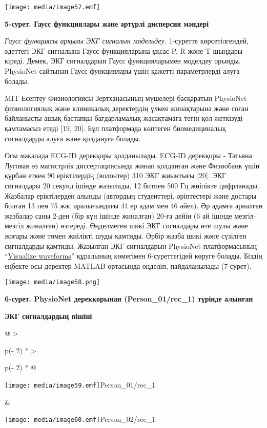 \documentclass[
]{article}
\begin{document}
\texttt{[image: media/image57.emf]}

\textbf{5-сурет. Гаусс функциялары және әртүрлі дисперсия мәндері}

\emph{Гаусс функциясы арқылы ЭКГ сигналын модельдеу.} 1-суретте
көрсетілгендей, әдеттегі ЭКГ сигналына Гаусс функцияларына ұқсас P, R
және T шыңдары кіреді. Демек, ЭКГ сигналдарын Гаусс функцияларымен
моделдеу орынды. PhysioNet сайтынан Гаусс функциялары үшін қажетті
параметрлерді алуға болады.

MIT Есептеу Физиологиясы Зертханасының мүшелері басқаратын PhysioNet
физиологиялық және клиникалық деректердің үлкен жинақтарына және соған
байланысты ашық бастапқы бағдарламалық жасақтамаға тегін қол жеткізуді
қамтамасыз етеді {[}19, 20{]}. Бұл платформада көптеген биомедициналық
сигналдарды алуға және қолдануға болады.

Осы мақалада ECG-ID дерекқоры қолданылады. ECG-ID дерекқоры - Татьяна
Луговая өз магистрлік диссертациясында жинап қолданған және Физиобанк
үшін құрбан еткен 90 еріктілердің (волонтер) 310 ЭКГ жиынтығы {[}20{]}.
ЭКГ сигналдары 20 секунд ішінде жазылады, 12 битпен 500 Гц жиілікте
цифрланады. Жазбалар еріктілерден алынды (автордың студенттері,
әріптестері және достары болған 13 пен 75 жас аралығындағы 44 ер адам
мен 46 әйел). Әр адамға арналған жазбалар саны 2-ден (бір күн ішінде
жиналған) 20-ға дейін (6 ай ішінде мезгіл-мезгіл жиналған) өзгереді.
Өңделмеген шикі ЭКГ сигналдары өте шулы және жоғары және төмен жиілікті
шуды қамтиды. Әрбір жазба шикі және сүзілген сигналдарды қамтиды.
Жазылған ЭКГ сигналдарын PhysioNet платформасының
``\href{https://physionet.org/lightwave/?db=ecgiddb/1.0.0}{Visualize
waveforms}'' құралының көмегімен 6-суреттегідей көруге болады. Біздің
еңбекте осы деректер MATLAB ортасында өңделіп, пайдаланылады (7-сурет).

\texttt{[image: media/image58.png]}

\textbf{6-сурет. PhysioNet дерекқорынан (Person\_01/rec\_1) түрінде
алынған}

\textbf{ЭКГ сигналдардың пішіні}

\begin{longtable}[]{@{}
  >{\raggedright\arraybackslash}p{(\columnwidth - 2\tabcolsep) * }
  >{\raggedright\arraybackslash}p{(\columnwidth - 2\tabcolsep) * }@{}}
\toprule\noalign{}
\begin{minipage}[b]{\linewidth}\raggedright
\texttt{[image: media/image59.emf]}Person\_01/rec\_1
\end{minipage} & \begin{minipage}[b]{\linewidth}\raggedright
\texttt{[image: media/image60.emf]}Person\_02/rec\_1
\end{minipage} \\
\midrule\noalign{}
\endhead
\bottomrule\noalign{}
\endlastfoot
\end{longtable}
\end{document}
